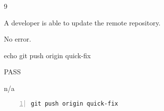 \begin{description}[align=right,leftmargin=3.2cm,labelindent=3.0cm]
\item[Step:] 9
\item[Confirm:] A developer is able to update the remote repository.
\item[Expectation:] No error.
\item[Command:] echo git  push origin quick-fix
\item[Test Result:] PASS
\item[Evidence:] n/a
\end{description}
\begin{lstlisting}[numbers=left]
git push origin quick-fix

\end{lstlisting}
